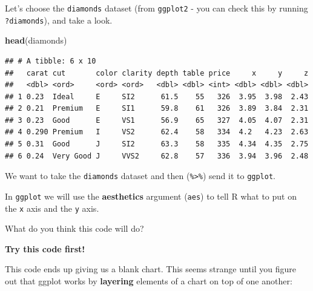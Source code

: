 \documentclass[
]{book}
\newenvironment{Shaded}{\begin{snugshade}}{\end{snugshade}}
\newcommand{\DataTypeTok}[1]{\textcolor[rgb]{0.13,0.29,0.53}{#1}}
\newcommand{\KeywordTok}[1]{\textcolor[rgb]{0.13,0.29,0.53}{\textbf{#1}}}
\newcommand{\NormalTok}[1]{#1}
\newcommand{\OperatorTok}[1]{\textcolor[rgb]{0.81,0.36,0.00}{\textbf{#1}}}
\newcommand{\StringTok}[1]{\textcolor[rgb]{0.31,0.60,0.02}{#1}}
\begin{document}
Let's choose the \texttt{diamonds} dataset (from \texttt{ggplot2} - you can check this by running \texttt{?diamonds}), and take a look.

\begin{Shaded}
\begin{Highlighting}[]
\KeywordTok{head}\NormalTok{(diamonds)}
\end{Highlighting}
\end{Shaded}

\begin{verbatim}
## # A tibble: 6 x 10
##   carat cut       color clarity depth table price     x     y     z
##   <dbl> <ord>     <ord> <ord>   <dbl> <dbl> <int> <dbl> <dbl> <dbl>
## 1 0.23  Ideal     E     SI2      61.5    55   326  3.95  3.98  2.43
## 2 0.21  Premium   E     SI1      59.8    61   326  3.89  3.84  2.31
## 3 0.23  Good      E     VS1      56.9    65   327  4.05  4.07  2.31
## 4 0.290 Premium   I     VS2      62.4    58   334  4.2   4.23  2.63
## 5 0.31  Good      J     SI2      63.3    58   335  4.34  4.35  2.75
## 6 0.24  Very Good J     VVS2     62.8    57   336  3.94  3.96  2.48
\end{verbatim}

\begin{translate}
We want to take the \texttt{diamonds} dataset and then
(\texttt{\%\textgreater{}\%}) send it to \texttt{ggplot}.

In \texttt{ggplot} we will use the \textbf{aesthetics} argument
(\texttt{aes}) to tell R what to put on the \texttt{x} axis and the
\texttt{y} axis.
\end{translate}

\begin{Shaded}
\end{Shaded}

What do you think this code will do?

\textbf{Try this code first!}

This code ends up giving us a blank chart. This seems strange until you figure out that ggplot works by \textbf{layering} elements of a chart on top of one another:

\begin{Shaded}
\end{Shaded}
\end{document}
